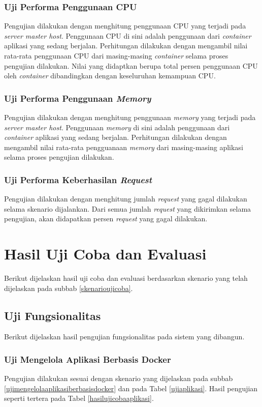         \subsubsection{Uji Performa Penggunaan CPU}
        	Pengujian dilakukan dengan menghitung penggunaan CPU yang terjadi pada \textit{server master host}. Penggunaan CPU di sini adalah penggunaan dari \textit{container} aplikasi yang sedang berjalan. Perhitungan dilakukan dengan mengambil nilai rata-rata penggunaan CPU dari masing-masing \textit{container} selama proses pengujian dilakukan. Nilai yang didaptkan berupa total persen penggunaan CPU oleh \textit{container} dibandingkan dengan keseluruhan kemampuan CPU.
        \subsubsection{Uji Performa Penggunaan \textit{Memory}}
        	Pengujian dilakukan dengan menghitung penggunaan \textit{memory} yang terjadi pada \textit{server master host}. Penggunaan \textit{memory} di sini adalah penggunaan dari \textit{container} aplikasi yang sedang berjalan. Perhitungan dilakukan dengan mengambil nilai rata-rata pengguanaan \textit{memory} dari masing-masing aplikasi selama proses pengujian dilakukan.
        \subsubsection{Uji Performa Keberhasilan \textit{Request}}
        	Pengujian dilakukan dengan menghitung jumlah \textit{request} yang gagal dilakukan selama skenario dijalankan. Dari semua jumlah \textit{request} yang dikirimkan selama pengujian, akan didapatkan persen \textit{request} yang gagal dilakukan.
    
\section{Hasil Uji Coba dan Evaluasi}
	Berikut dijelaskan hasil uji coba dan evaluasi berdasarkan skenario yang telah dijelaskan pada subbab \ref{skenarioujicoba}.
    
	\subsection{Uji Fungsionalitas}
    	Berikut dijelaskan hasil pengujian fungsionalitas pada sistem yang dibangun.
        
        \subsubsection{Uji Mengelola Aplikasi Berbasis Docker}
    	Pengujian dilakukan sesuai dengan skenario yang dijelaskan pada subbab \ref{ujimengelolaaplikasiberbasisdocker} dan pada Tabel \ref{ujiaplikasi}. Hasil pengujian seperti tertera pada Tabel \ref{hasilujicobaaplikasi}.
        
